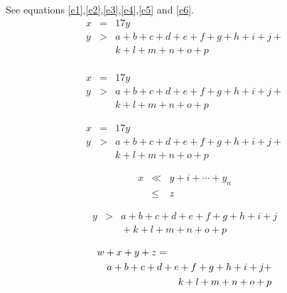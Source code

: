 \documentclass{article}
\begin{document}
See equations \ref{e1},\ref{e2},\ref{e3},\ref{e4},\ref{e5} and \ref{e6}.
\begin{eqnarray}
x & = & 17y \label{e1}\\
y & > & a + b + c + d + e + f + g + h + i + j + \nonumber \\
  &   & k + l + m + n + o + p \label{e2} \\
\end{eqnarray}

\begin{eqnarray}
x & = & 17y \label{e3}\\
y & > & a + b + c + d + e + f + g + h + i + j + \nonumber \\
  &   & k + l + m + n + o + p \label{e4}
\end{eqnarray}

\begin{eqnarray}
\label{e5}
x & = & 17y \\
\label{e6}
y & > & a + b + c + d + e + f + g + h + i + j + \nonumber \\
  &   & k + l + m + n + o + p
\end{eqnarray}

\begin{eqnarray*}
  x & \ll & y+i + \cdots + y_n \\
    & \leq & z
\end{eqnarray*}

\begin{eqnarray*}
y & > & a + b + c + d + e + f + g + h + i + j\\
  &   & \mbox{} + k + l + m + n + o + p
\end{eqnarray*}

\begin{eqnarray*}
\lefteqn{w+x+y+z=}\\
  & & a + b + c + d + e + f + g + h + i + j + \\
  & & k + l + m + n + o + p
\end{eqnarray*}
\end{document}
